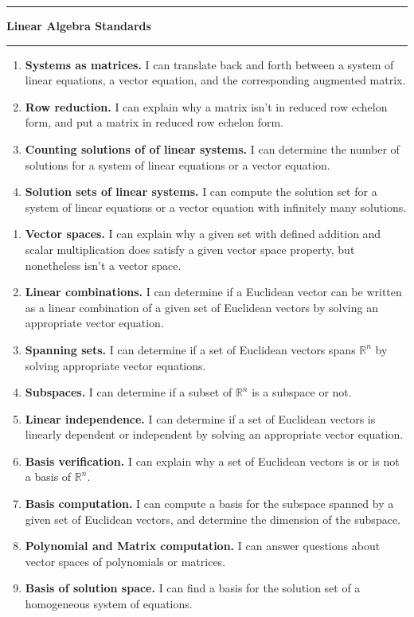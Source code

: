 \documentclass{article}
\newcommand{\module}{?}
\newcommand{\setModule}[1]{\renewcommand{\module}{#1}}
\newenvironment{moduleStandards}{
  \begin{enumerate}[\bf\(\Box\) \(\Box\) \module{}1.]
  \setlength{\itemsep}{-0.02in}
}{
  \end{enumerate}
}
\newcommand{\standard}[3]{
  \item \textbf{#1.}
        I can#3
}
\newcommand{\IR}{\mathbb{R}}
\begin{document}
\pagestyle{empty}
\vspace{0.3in}
\hrule
\begin{center}\large \textbf{Linear Algebra Standards}\end{center}
\hrule
\vspace{0.1in}

\setModule{LE}
\begin{moduleStandards}
  \standard{Systems as matrices}{SysMat}{
    translate back and forth between a system of linear equations, 
	a vector equation, and the corresponding augmented matrix.
  }
  \standard{Row reduction}{Rref}{
    explain why a matrix isn't in reduced row echelon form, and put a matrix in reduced row echelon form.
  }
  \standard{Counting solutions of of linear systems}{SlvSys}{
    determine the number of solutions for a system of linear equations or a vector equation.
  }
    \standard{Solution sets of linear systems}{SlvSys}{
    compute the solution set for a system of linear equations or a vector equation with infinitely many solutions.
  }
\end{moduleStandards}
\setModule{VS}
\begin{moduleStandards}
  \standard{Vector spaces}{VecSp}{
    explain why a given set with defined addition and scalar multiplication does satisfy a given vector space property, but nonetheless isn't a vector space.
  }
  \standard{Linear combinations}{LinCmb}{
    determine if a Euclidean vector can be written as a linear combination of a given set of Euclidean vectors by solving an appropriate vector equation.
  }
  \standard{Spanning sets}{Span}{
    determine if a set of Euclidean vectors spans \(\IR^n\) by solving appropriate vector equations.
  }
  \standard{Subspaces}{Subsp}{
    determine if a subset of \(\IR^n\) is a subspace or not.
  }
  \standard{Linear independence}{LinInd}{
    determine if a set of Euclidean vectors is linearly dependent or
    independent by solving an appropriate vector equation.
  }
  \standard{Basis verification}{BasVer}{
    explain why a set of Euclidean vectors is or is not a basis of \(\IR^n\).
  }
  \standard{Basis computation}{BasCmp}{
    compute a basis for the subspace spanned by a given set of Euclidean
    vectors, and determine the dimension of the subspace.
  }
  \standard{Polynomial and Matrix computation}{PolyBasis}{
     answer questions about vector spaces of polynomials or matrices.
  }
  \standard{Basis of solution space}{BasSol}{
    find a basis for the solution set of a homogeneous system of equations.
  }
\end{moduleStandards}
\end{document}
